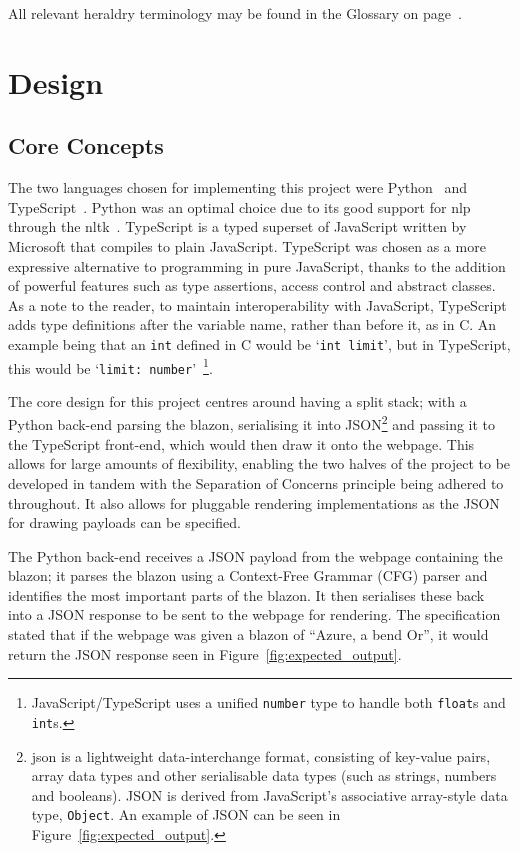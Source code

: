 \documentclass[nobib, a4paper, twoside, justified]{tufte-book}
\makeatletter
\newcommand{\blazon}{\gls{blazon}\@\xspace}
\newcommand{\payload}{\gls{payload}\@\xspace}
\newcommand{\payloads}{\glspl{payload}\@\xspace}
\makeatother
\begin{document}
All relevant heraldry terminology may be found in the Glossary on page~\pageref{main}.

\chapter{Design}%
\label{cha:design}

\section{Core Concepts}%
\label{sec:core_concepts}

The two languages chosen for implementing this project were Python~\autocite{python} and
TypeScript~\autocite{typescript}. Python was an optimal choice due to its good support for
\gls{nlp} through the \gls{nltk}~\autocite{bird2004nltk}. TypeScript is a typed superset of
JavaScript written by Microsoft that compiles to plain JavaScript. TypeScript was chosen as a more
expressive alternative to programming in pure JavaScript, thanks to the addition of powerful
features such as type assertions, access control and abstract classes. As a note to the reader, to
maintain interoperability with JavaScript, TypeScript adds type definitions after the variable
name, rather than before it, as in C. An example being that an \texttt{int} defined in C would be
`\texttt{int limit}', but in TypeScript, this would be `\texttt{limit:
number}'~\footnote{JavaScript/TypeScript uses a unified \texttt{number} type to handle both
\texttt{float}s and \texttt{int}s.}.

The core design for this project centres around having a split stack; with a Python back-end
parsing the \blazon, serialising it into JSON\footnote{\gls{json} is a lightweight data-interchange
  format, consisting of key-value pairs, array data types and other serialisable data types (such
  as strings, numbers and booleans). JSON is derived from JavaScript's associative array-style data
type, \texttt{Object}. An example of JSON can be seen in Figure~\ref{fig:expected_output}.} and
passing it to the TypeScript front-end, which would then draw it onto the webpage. This allows for
large amounts of flexibility, enabling the two halves of the project to be developed in tandem with
the Separation of Concerns principle being adhered to throughout. It also allows for pluggable
rendering implementations as the JSON for drawing \payloads can be specified.

The Python back-end receives a JSON \payload from the webpage containing the \blazon; it parses the
\blazon using a Context-Free Grammar (CFG) parser and identifies the most important parts of the
\blazon. It then serialises these back into a JSON response to be sent to the webpage for rendering.
The specification stated that if the webpage was given a \blazon of ``Azure, a bend Or'', it would
return the JSON response seen in Figure~\ref{fig:expected_output}.
\end{document}
